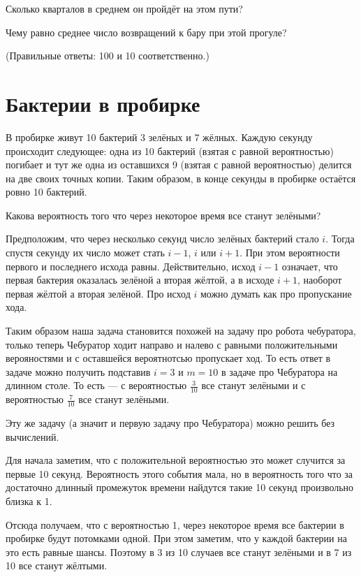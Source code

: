 \documentclass{article}
\begin{document}
Сколько кварталов в среднем он пройдёт на этом пути?

Чему равно среднее число возвращений к бару при этой прогуле?

(Правильные ответы: 100 и 10 соответственно.)


\section{Бактерии в пробирке}

В пробирке живут 10 бактерий 3 зелёных и 7 жёлных.
Каждую секунду происходит следующее: одна из 10 бактерий (взятая с равной вероятностью) погибает
и тут же одна из оставшихся 9 (взятая с равной вероятностью)
 делится на две своих точных копии.
Таким образом,
в конце секунды в пробирке остаётся ровно 10 бактерий.

Какова вероятность того что через некоторое время все станут зелёными?


Предположим, что через несколько секунд 
число зелёных бактерий стало $i$.
Тогда спустя секунду их число может стать $i-1$, $i$ или $i+1$.
При этом вероятности первого и последнего исхода равны.
Действительно, исход $i-1$ означает, 
что первая бактерия оказалась зелёной а вторая жёлтой,
а в исходе $i+1$,
наоборот первая жёлтой а вторая зелёной.
Про исход $i$ можно думать как про пропускание хода.

Таким образом наша задача становится похожей на задачу про робота чебуратора, только теперь Чебуратор ходит направо и налево с равными положительными верояностями и с оставшейся вероятнотсью пропускает ход.
То есть ответ в задаче можно получить подставив $i=3$ и $m=10$ в задаче про Чебуратора на длинном столе.
То есть --- с вероятностью $\tfrac{3}{10}$ все станут зелёными 
и с вероятностью $\tfrac{7}{10}$ все станут зелёными.

\medskip

Эту же задачу (а значит и первую задачу про Чебуратора)
можно решить без вычислений.

Для начала заметим, что с положительной вероятностью это может случится за первые 10 секунд. 
Вероятность этого события мала,
но в вероятность того что за достаточно длинный промежуток времени найдутся такие 10 секунд произвольно близка к 1.

Отсюда получаем, что с вероятностью 1,
через некоторое время все бактерии в пробирке будут потомками одной.
При этом заметим, что у каждой бактерии на это есть равные шансы.
Поэтому в 3 из 10 случаев все станут зелёными и в 7 из 10 все станут жёлтыми.
\end{document}
